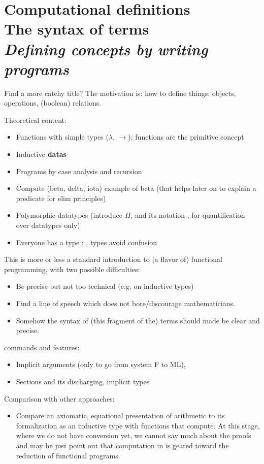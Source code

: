 \chapter{Computational definitions \\ The syntax of terms \\[2ex]\Large\itshape Defining concepts by writing programs}

Find a more catchy title? The motivation is: how to define things:
objects, operations, (boolean) relations.

Theoretical content:
\begin{itemize}
\item Functions with simple types ($\lambda$, $\rightarrow$): functions are the primitive concept
\item Inductive {\bf datas}
\item Programs by case analysis and recursion
\item Compute (beta, delta, iota) example of beta (that helps later on to explain a predicate for elim principles)
\item Polymorphic datatypes (introduce $\Pi$, and its \Coq{} notation
  , for quantification over datatypes only)
\item Everyone has a type : , types avoid confusion
\end{itemize}
This is more or less a standard introduction to (a flavor of)
functional programming, with two possible difficulties:
\begin{itemize}
\item Be precise but not too technical (e.g. on inductive types)
\item Find a line of speech which does not bore/discourage
  mathematicians.
\item Somehow the syntax of (this fragment of the) terms should made
  be clear and precise.
\end{itemize}

\Coq{} commands and features:
\begin{itemize}
\item Implicit arguments (only to go from system F to ML), 
\item Sections and its discharging, implicit types
\end{itemize}

Comparison with other approaches:
\begin{itemize}
\item Compare an axiomatic, equational presentation of arithmetic to
  its formalization as an inductive type with functions that
  compute. At this stage, where we do not have conversion yet, we
  cannot say much about the proofs and may be just point out that
  computation in \Coq{} is geared toward the reduction of functional
  programs.
\end{itemize}

